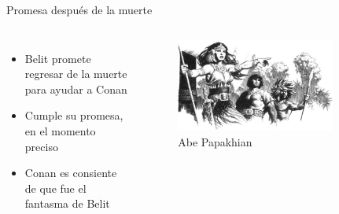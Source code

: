 \begin{frame}{Promesa después de la muerte}
	\begin{columns}
		\begin{itemize}
			\item Belit promete regresar de la muerte para ayudar a Conan
			\item Cumple su promesa, en el momento preciso
			\item Conan es consiente de que fue el fantasma de Belit
		\end{itemize}
		\begin{figure}[htb]
			\centering
			\includegraphics[width=0.8\textwidth]{img/tributos/elephant07}
			\caption{Abe Papakhian}
		\end{figure}
	\end{columns}
\end{frame}
\note[itemize]{
	\item
}

